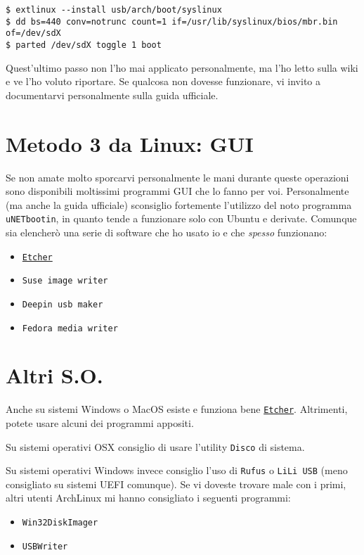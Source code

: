 \documentclass[twoside,italian]{book}
\newcommand{\code}[1]{\texttt{#1}}
\newcommand{\arch}{ArchLinux}
\begin{document}
    \begin{lstlisting}
$ extlinux --install usb/arch/boot/syslinux
$ dd bs=440 conv=notrunc count=1 if=/usr/lib/syslinux/bios/mbr.bin of=/dev/sdX
$ parted /dev/sdX toggle 1 boot
    \end{lstlisting}

    \begin{tcolorbox}[floatplacement=b,width=\textwidth,colback={white},title={ATTENZIONE:},colbacktitle=code,coltitle=white,colupper=code]
        Quest'ultimo passo non l'ho mai applicato personalmente, ma l'ho letto sulla wiki e ve l'ho voluto riportare. Se qualcosa non dovesse funzionare, vi invito a documentarvi personalmente sulla guida ufficiale.
    \end{tcolorbox}


\section{Metodo 3 da Linux: GUI}
    Se non amate molto sporcarvi personalmente le mani durante queste operazioni sono disponibili moltissimi programmi \ac{GUI} che lo fanno per voi. Personalmente (ma anche la guida ufficiale) sconsiglio fortemente l'utilizzo del noto programma \code{uNETbootin}, in quanto tende a funzionare solo con Ubuntu e derivate. Comunque sia elencherò una serie di software che ho usato io e che \emph{spesso} funzionano:
    \begin{itemize}
        \item \href{https://etcher.io}{\code{Etcher}}
        \item \code{Suse image writer}
        \item \code{Deepin usb maker}
        \item \code{Fedora media writer}
    \end{itemize}


\section{Altri S.O.}
    
    Anche su sistemi Windows o MacOS esiste e funziona bene \href{https://etcher.io}{\code{Etcher}}. Altrimenti, potete usare alcuni dei programmi appositi.

    Su sistemi operativi OSX consiglio di usare l'utility \code{Disco} di sistema.
    
    Su sistemi operativi Windows invece consiglio l'uso di \code{Rufus} o \code{LiLi USB} (meno consigliato su sistemi \ac{UEFI} comunque).
    Se vi doveste trovare male con i primi, altri utenti \arch{} mi hanno consigliato i seguenti programmi:
    \begin{itemize}
        \item \code{Win32DiskImager}
        \item \code{USBWriter}
    \end{itemize}
    
\end{document}
